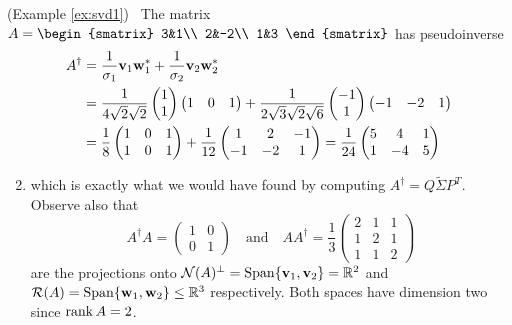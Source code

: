 \begin{examples}{}{}
	\exstart (Example \ref{ex:svd1}) \ The matrix $A=
	\smash{\begin{smatrix}
	  3&1\\
	  2&-2\\
	  1&3
	\end{smatrix}}$
	has pseudoinverse
  \begin{align*}
	  A^\dag
	  &=\frac 1{\sigma_1}{\mathbf{v}}_1{\mathbf{w}}_1^*+\frac 1{\sigma_2}{\mathbf{v}}_2{\mathbf{w}}_2^*\\
	  &=\frac 1{4\sqrt 2\sqrt 2}\begin{pmatrix}1\\1\end{pmatrix}
	  	\begin{pmatrix}
				1&0&1
			\end{pmatrix}
	  	+\frac 1{2\sqrt 3\sqrt 2\sqrt 6}\begin{pmatrix}-1\\1\end{pmatrix}
	  	\begin{pmatrix}
				-1&-2&1
			\end{pmatrix}\\
	  &=\frac 18
	  \begin{pmatrix}
	  	1&0&1\\
	  	1&0&1
	  \end{pmatrix}
	  +\frac 1{12}
	  \begin{pmatrix}
	  	1&2&-1\\
	  	-1&-2&1
	  \end{pmatrix}
	  =\frac 1{24}
	  \begin{pmatrix}
	  	5&4&1\\
	  	1&-4&5
	  \end{pmatrix}
  \end{align*}\vspace{-8pt}
	\begin{enumerate}\setcounter{enumi}{1}
	  \item[] which is exactly what we would have found by computing $A^\dag=Q\widetilde\Sigma P^T$. Observe also that
	  \[
	  	A^\dag A=
	  	\begin{pmatrix}
	  		1&0\\
	  		0&1
	  	\end{pmatrix}
	  	\quad\text{and}\quad
	  	AA^\dag=\frac 13
	  	\begin{pmatrix}
	  		2&1&1\\
	  		1&2&1\\
	  		1&1&2
	  	\end{pmatrix}
	  \]
	  are the projections onto $\mathcal{N}(A)^\perp=\operatorname{Span}\{{\mathbf{v}}_1,{\mathbf{v}}_2\}=\mathbb{R}^2$ and $\mathcal{R}(A)=\operatorname{Span}\{{\mathbf{w}}_1,{\mathbf{w}}_2\}\le\mathbb{R}^3$ respectively. Both spaces have dimension two since $\operatorname{rank} A=2$.
	

\end{enumerate}
\end{examples}
